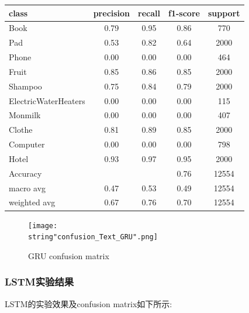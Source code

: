 \documentclass[UTF8]{ctexart}
\begin{document}
\begin{tabular}{|l|c|c|c|c|} %
    \hline 
    class & precision & recall & f1-score & support\\
    \hline 
    Book & 0.79 & 0.95 & 0.86 & 770 \\
    Pad & 0.53 & 0.82 & 0.64 & 2000 \\
    Phone &0.00&0.00&0.00&464\\
    Fruit &0.85&0.86&0.85&2000\\
    Shampoo &0.75&0.84&0.79&2000\\
    ElectricWaterHeaters &0.00&0.00&0.00&115\\
    Monmilk &0.00&0.00&0.00&407\\
    Clothe &0.81&0.89&0.85&2000\\
    Computer &0.00&0.00&0.00&798\\
    Hotel &0.93&0.97&0.95&2000\\
    Accuracy & &&0.76&12554\\
    macro avg &0.47 &0.53&0.49&12554\\
    weighted avg & 0.67&0.76&0.70&12554\\
    \hline 
\end{tabular}

\begin{figure}[H]
    \begin{center}
        \texttt{[image: \\string"confusion\_Text\_GRU".png]}
    \caption{GRU confusion matrix}
    \label{fig:9}
    \end{center}
    \end{figure}
\par


\subsubsection{LSTM实验结果}
LSTM的实验效果及confusion matrix如下所示:\par
\end{document}
